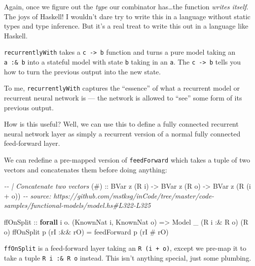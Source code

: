 \documentclass[]{article}
\newenvironment{Shaded}{}{}
\newcommand{\CommentTok}[1]{\textcolor[rgb]{0.38,0.63,0.69}{\textit{#1}}}
\newcommand{\DataTypeTok}[1]{\textcolor[rgb]{0.56,0.13,0.00}{#1}}
\newcommand{\KeywordTok}[1]{\textcolor[rgb]{0.00,0.44,0.13}{\textbf{#1}}}
\newcommand{\NormalTok}[1]{#1}
\newcommand{\OperatorTok}[1]{\textcolor[rgb]{0.40,0.40,0.40}{#1}}
\newcommand{\OtherTok}[1]{\textcolor[rgb]{0.00,0.44,0.13}{#1}}
\begin{document}
Again, once we figure out the \emph{type} our combinator has\ldots the function
\emph{writes itself}. The joys of Haskell! I wouldn't dare try to write this in
a language without static types and type inference. But it's a real treat to
write this out in a language like Haskell.

\texttt{recurrentlyWith} takes a \texttt{c\ -\textgreater{}\ b} function and
turns a pure model taking an \texttt{a\ :\&\ b} into a stateful model with state
\texttt{b} taking in an \texttt{a}. The \texttt{c\ -\textgreater{}\ b} tells you
how to turn the previous output into the new state.

To me, \texttt{recurrentlyWith} captures the ``essence'' of what a recurrent
model or recurrent neural network is --- the network is allowed to ``see'' some
form of its previous output.

How is this useful? Well, we can use this to define a fully connected recurrent
neural network layer as simply a recurrent version of a normal fully connected
feed-forward layer.

We can redefine a pre-mapped version of \texttt{feedForward} which takes a tuple
of two vectors and concatenates them before doing anything:

\begin{Shaded}
\begin{Highlighting}[]
\CommentTok{{-}{-} | Concatenate two vectors}
\OtherTok{(\#) ::} \DataTypeTok{BVar}\NormalTok{ z (}\DataTypeTok{R}\NormalTok{ i) }\OtherTok{{-}\textgreater{}} \DataTypeTok{BVar}\NormalTok{ z (}\DataTypeTok{R}\NormalTok{ o) }\OtherTok{{-}\textgreater{}} \DataTypeTok{BVar}\NormalTok{ z (}\DataTypeTok{R}\NormalTok{ (i }\OperatorTok{+}\NormalTok{ o))}
\CommentTok{{-}{-} source: https://github.com/mstksg/inCode/tree/master/code{-}samples/functional{-}models/model.hs\#L322{-}L325}

\NormalTok{ffOnSplit}
\OtherTok{    ::} \KeywordTok{forall}\NormalTok{ i o}\OperatorTok{.}\NormalTok{ (}\DataTypeTok{KnownNat}\NormalTok{ i, }\DataTypeTok{KnownNat}\NormalTok{ o)}
    \OtherTok{=\textgreater{}} \DataTypeTok{Model}\NormalTok{ \_ (}\DataTypeTok{R}\NormalTok{ i }\OperatorTok{:\&} \DataTypeTok{R}\NormalTok{ o) (}\DataTypeTok{R}\NormalTok{ o)}
\NormalTok{ffOnSplit p (rI }\OperatorTok{:\&\&}\NormalTok{ rO) }\OtherTok{=}\NormalTok{ feedForward p (rI }\OperatorTok{\#}\NormalTok{ rO)}
\end{Highlighting}
\end{Shaded}

\texttt{ffOnSplit} is a feed-forward layer taking an \texttt{R\ (i\ +\ o)},
except we pre-map it to take a tuple \texttt{R\ i\ :\&\ R\ o} instead. This
isn't anything special, just some plumbing.
\end{document}

